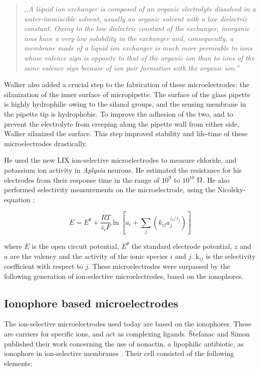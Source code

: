 \begin{quote}
\vspace{0.5cm}
\emph{,,A liquid ion exchanger is composed of an organic electrolyte dissolved in a water-immiscible solvent, usually an organic solvent with a low dielectric constant.
Owing to the low dielectric constant of the exchanger, inorganic ions have a very low solubility in the exchanger and, consequently, a membrane made of a liquid ion exchanger is much more permeable to ions whose valence sign is opposite to that of the organic ion than to ions of the same valence sign because of ion pair formation with the organic ion.''}
\vspace{0.5cm}
\end{quote} 

\label{silanize}
Walker also added a crucial step to the fabrication of these microelectrodes: the silanization of the inner surface of micropipette.
The surface of the glass pipette is highly hydrophilic owing to the silanol groups, and the sensing membrane in the pipette tip is hydrophobic.
To improve the adhesion of the two, and to prevent the electrolyte from creeping along the pipette wall from either side, Walker silanized the surface.
This step improved stability and life-time of these microelectrodes drastically.

He used the new LIX ion-selective microelectrodes to measure chloride, and potassium ion activity in \emph{Aplysia} neurons.
He estimated the resistance for his electrodes from their response time in the range of $10^9$ to $10^{10}$ $\ohm$.
He also performed selectivity measurements on the microelectrode, using the Nicolsky-equation \cite{nicolsky1937theory}:

\begin{equation}
E=E^\theta + \frac{RT}{z_iF} \ln \left [ a_i + \sum_{j} \left ( k_{ij}a_j^{z_i/z_j} \right ) \right ]
\end{equation}

where $E$ is the open circuit potential, $E^\theta$ the standard electrode potential, $z$ and $a$ are the valency and the activity of the ionic species $i$ and $j$. k$_{ij}$ is the selectivity coefficient with respect to $j$.
These microelectrodes were surpassed by the following generation of ion-selective microelectrodes, based on the ionophores.

\subsection{Ionophore based microelectrodes}
\label{ionophore_based}
The ion-selective microelectrodes used today are based on the ionophores.
These are carriers for specific ions, and act as complexing ligands.
\v{S}tefanac and Simon published their work concerning the use of nonactin, a lipophilic antibiotic, as ionophore in ion-selective membranes \cite{stefanac1966highly, vstefanac1967ion}.
Their cell consisted of the following elements:

